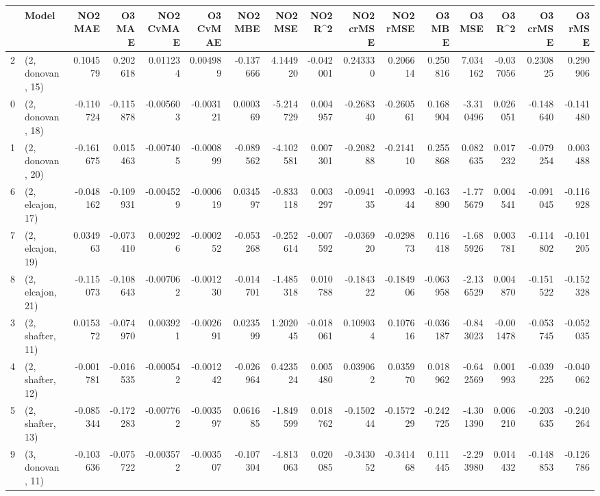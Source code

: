 \begin{tabular}{llrrrrrrrrrrrrrr}
\toprule
{} &             Model &   NO2 MAE &    O3 MAE &  NO2 CvMAE &  O3 CvMAE &   NO2 MBE &    NO2 MSE &   NO2 R\textasciicircum2 &  NO2 crMSE &  NO2 rMSE &    O3 MBE &     O3 MSE &    O3 R\textasciicircum2 &  O3 crMSE &   O3 rMSE \\
\midrule
2  &  (2, donovan, 15) &  0.104579 &  0.202618 &   0.011234 &  0.004989 & -0.137666 &   4.144920 & -0.042001 &   0.243330 &  0.206614 &  0.250816 &   7.034162 & -0.037056 &  0.230825 &  0.290906 \\
0  &  (2, donovan, 18) & -0.110724 & -0.115878 &  -0.005603 & -0.003121 &  0.000369 &  -5.214729 &  0.004957 &  -0.268340 & -0.260561 &  0.168904 &  -3.310496 &  0.026051 & -0.148640 & -0.141480 \\
1  &  (2, donovan, 20) & -0.161675 &  0.015463 &  -0.007405 & -0.000899 & -0.089562 &  -4.102581 &  0.007301 &  -0.208288 & -0.214110 &  0.255868 &   0.082635 &  0.017232 & -0.079254 &  0.003488 \\
6  &  (2, elcajon, 17) & -0.048162 & -0.109931 &  -0.004529 & -0.000619 &  0.034597 &  -0.833118 &  0.003297 &  -0.094135 & -0.099344 & -0.163890 &  -1.775679 &  0.004541 & -0.091045 & -0.116928 \\
7  &  (2, elcajon, 19) &  0.034963 & -0.073410 &   0.002926 & -0.000252 & -0.053268 &  -0.252614 & -0.007592 &  -0.036920 & -0.029873 &  0.116418 &  -1.685926 &  0.003781 & -0.114802 & -0.101205 \\
8  &  (2, elcajon, 21) & -0.115073 & -0.108643 &  -0.007062 & -0.001230 & -0.014701 &  -1.485318 &  0.010788 &  -0.184322 & -0.184906 & -0.063958 &  -2.136529 &  0.004870 & -0.151522 & -0.152328 \\
3  &  (2, shafter, 11) &  0.015372 & -0.074970 &   0.003921 & -0.002691 &  0.023599 &   1.202045 & -0.018061 &   0.109034 &  0.107616 & -0.036187 &  -0.843023 & -0.001478 & -0.053745 & -0.052035 \\
4  &  (2, shafter, 12) & -0.001781 & -0.016535 &  -0.000542 & -0.001242 & -0.026964 &   0.423524 &  0.005480 &   0.039062 &  0.035970 &  0.018962 &  -0.642569 &  0.001993 & -0.039225 & -0.040062 \\
5  &  (2, shafter, 13) & -0.085344 & -0.172283 &  -0.007762 & -0.003597 &  0.061685 &  -1.849599 &  0.018762 &  -0.150244 & -0.157229 & -0.242725 &  -4.301390 &  0.006210 & -0.203635 & -0.240264 \\
9  &  (3, donovan, 11) & -0.103636 & -0.075722 &  -0.003572 & -0.003507 & -0.107304 &  -4.813063 &  0.020085 &  -0.343052 & -0.341468 &  0.111445 &  -2.293980 &  0.014432 & -0.148853 & -0.126786 \\

\end{tabular}
